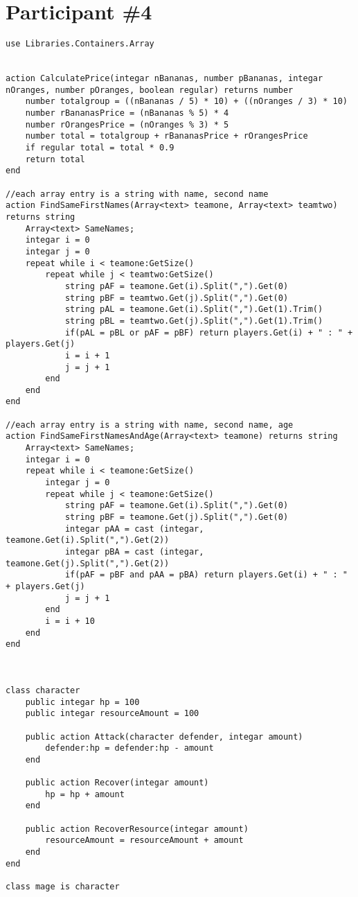 \section{Participant \#4}
\begin{lstlisting}[language=Quorum,tabsize=2]
use Libraries.Containers.Array


action CalculatePrice(integar nBananas, number pBananas, integar nOranges, number pOranges, boolean regular) returns number
	number totalgroup = ((nBananas / 5) * 10) + ((nOranges / 3) * 10)
	number rBananasPrice = (nBananas % 5) * 4
	number rOrangesPrice = (nOranges % 3) * 5
	number total = totalgroup + rBananasPrice + rOrangesPrice
	if regular total = total * 0.9
	return total
end

//each array entry is a string with name, second name
action FindSameFirstNames(Array<text> teamone, Array<text> teamtwo) returns string
	Array<text> SameNames;
	integar i = 0
	integar j = 0
	repeat while i < teamone:GetSize()
		repeat while j < teamtwo:GetSize()
			string pAF = teamone.Get(i).Split(",").Get(0)
			string pBF = teamtwo.Get(j).Split(",").Get(0)
			string pAL = teamone.Get(i).Split(",").Get(1).Trim()
			string pBL = teamtwo.Get(j).Split(",").Get(1).Trim()
			if(pAL = pBL or pAF = pBF) return players.Get(i) + " : " + players.Get(j)
			i = i + 1
			j = j + 1
		end
	end
end

//each array entry is a string with name, second name, age
action FindSameFirstNamesAndAge(Array<text> teamone) returns string
	Array<text> SameNames;
	integar i = 0
	repeat while i < teamone:GetSize()
		integar j = 0
		repeat while j < teamone:GetSize()
			string pAF = teamone.Get(i).Split(",").Get(0)
			string pBF = teamone.Get(j).Split(",").Get(0)
			integar pAA = cast (integar, teamone.Get(i).Split(",").Get(2))
			integar pBA = cast (integar, teamone.Get(j).Split(",").Get(2))
			if(pAF = pBF and pAA = pBA) return players.Get(i) + " : " + players.Get(j)
			j = j + 1
		end
		i = i + 10
	end
end



class character
	public integar hp = 100
	public integar resourceAmount = 100
	
	public action Attack(character defender, integar amount)
		defender:hp = defender:hp - amount
	end
	
	public action Recover(integar amount)
		hp = hp + amount
	end
	
	public action RecoverResource(integar amount)
		resourceAmount = resourceAmount + amount
	end
end

class mage is character


\end{lstlisting}
